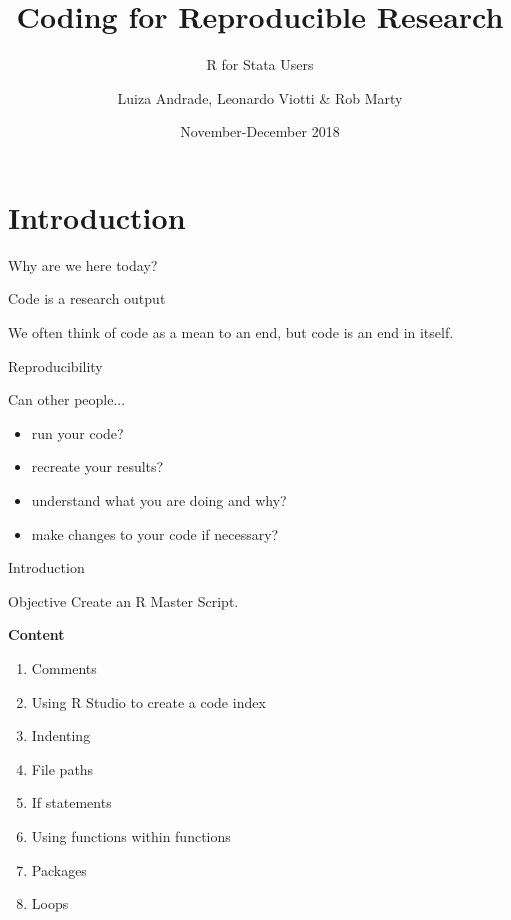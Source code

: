 \documentclass[ignorenonframetext,]{beamer}
\title{Coding for Reproducible Research}
\subtitle{R for Stata Users}
\author{Luiza Andrade, Leonardo Viotti \& Rob Marty}
\date{November-December 2018}
\begin{document}
\frame{\titlepage}

\begin{frame}
\tableofcontents[hideallsubsections]
\end{frame}

\section{Introduction}\label{introduction}

\begin{frame}{Why are we here today?}

\begin{block}{Code is a research output}

We often think of code as a mean to an end, but code is an end in
itself.

\end{block}

\end{frame}

\begin{frame}{Reproducibility}

\begin{block}{Can other people...}
      \begin{itemize}
        \item run your code?
      \item recreate your results?
      \item understand what you are doing and why?
      \item make changes to your code if necessary?
    \end{itemize}
  \end{block}

\end{frame}

\begin{frame}{Introduction}

\begin{block}{Objective}
      Create an R Master Script.
  \end{block}

\textbf{Content}

\begin{enumerate}
      \item Comments
      \item Using R Studio to create a code index
      \item Indenting
      \item File paths
      \item If statements
      \item Using functions within functions
      \item Packages
      \item Loops
    \end{enumerate}

\end{frame}
\end{document}
